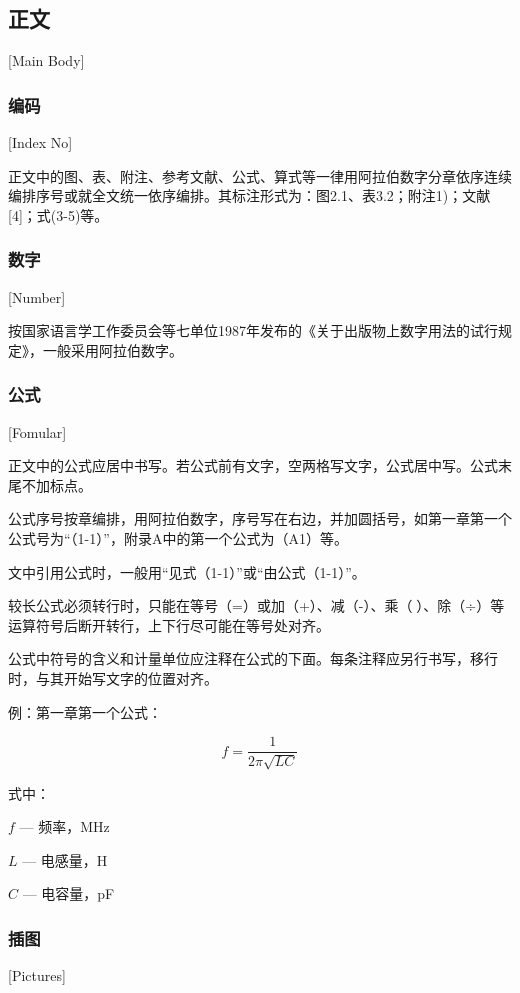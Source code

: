 \subsection{正文}[Main Body]


\subsubsection{编码}[Index No]

正文中的图、表、附注、参考文献、公式、算式等一律用阿拉伯数字分章依序连续编排序号或就全文统一依序编排。其标注形式为：图2.1、表3.2；附注1)；文献[4]；式(3-5)等。

\subsubsection{数字}[Number]

按国家语言学工作委员会等七单位1987年发布的《关于出版物上数字用法的试行规定》，一般采用阿拉伯数字。

\subsubsection{公式}[Fomular]

正文中的公式应居中书写。若公式前有文字，空两格写文字，公式居中写。公式末尾不加标点。

公式序号按章编排，用阿拉伯数字，序号写在右边，并加圆括号，如第一章第一个公式号为“（1-1）”，附录A中的第一个公式为（A1）等。

文中引用公式时，一般用“见式（1-1）”或“由公式（1-1）”。

较长公式必须转行时，只能在等号（=）或加（+）、减（-）、乘（）、除（÷）等运算符号后断开转行，上下行尽可能在等号处对齐。

公式中符号的含义和计量单位应注释在公式的下面。每条注释应另行书写，移行时，与其开始写文字的位置对齐。

例：第一章第一个公式：

\begin{equation}\label{form2x1}
  f=\frac{1}{2\pi\sqrt{LC}}
\end{equation}

式中：

\qquad $f$ --- 频率，MHz

\qquad $L$ --- 电感量，H

\qquad $C$ --- 电容量，pF

\subsubsection{插图}[Pictures]

